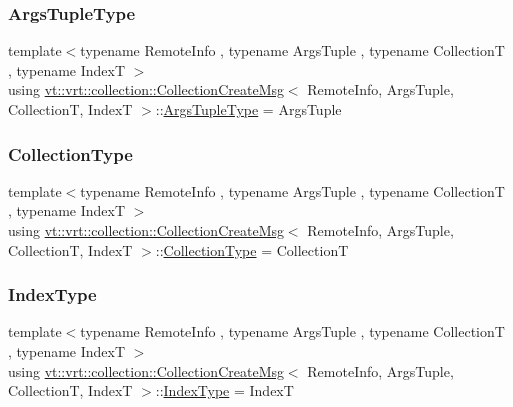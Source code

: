 \subsubsection{\texorpdfstring{Args\+Tuple\+Type}{ArgsTupleType}}
{\footnotesize\ttfamily template$<$typename Remote\+Info , typename Args\+Tuple , typename CollectionT , typename IndexT $>$ \\
using \hyperlink{structvt_1_1vrt_1_1collection_1_1_collection_create_msg}{vt\+::vrt\+::collection\+::\+Collection\+Create\+Msg}$<$ Remote\+Info, Args\+Tuple, CollectionT, IndexT $>$\+::\hyperlink{structvt_1_1vrt_1_1collection_1_1_collection_create_msg_abb55583fc386581742c169c93840744f}{Args\+Tuple\+Type} =  Args\+Tuple}

\mbox{\label{structvt_1_1vrt_1_1collection_1_1_collection_create_msg_a32f39cc924fbbe6f445d48f5b74ded8f}} 
\subsubsection{\texorpdfstring{Collection\+Type}{CollectionType}}
{\footnotesize\ttfamily template$<$typename Remote\+Info , typename Args\+Tuple , typename CollectionT , typename IndexT $>$ \\
using \hyperlink{structvt_1_1vrt_1_1collection_1_1_collection_create_msg}{vt\+::vrt\+::collection\+::\+Collection\+Create\+Msg}$<$ Remote\+Info, Args\+Tuple, CollectionT, IndexT $>$\+::\hyperlink{structvt_1_1vrt_1_1collection_1_1_collection_create_msg_a32f39cc924fbbe6f445d48f5b74ded8f}{Collection\+Type} =  CollectionT}

\mbox{\label{structvt_1_1vrt_1_1collection_1_1_collection_create_msg_a32b4a63169ad3f9063002a91dadb2435}} 
\subsubsection{\texorpdfstring{Index\+Type}{IndexType}}
{\footnotesize\ttfamily template$<$typename Remote\+Info , typename Args\+Tuple , typename CollectionT , typename IndexT $>$ \\
using \hyperlink{structvt_1_1vrt_1_1collection_1_1_collection_create_msg}{vt\+::vrt\+::collection\+::\+Collection\+Create\+Msg}$<$ Remote\+Info, Args\+Tuple, CollectionT, IndexT $>$\+::\hyperlink{structvt_1_1vrt_1_1collection_1_1_collection_create_msg_a32b4a63169ad3f9063002a91dadb2435}{Index\+Type} =  IndexT}



